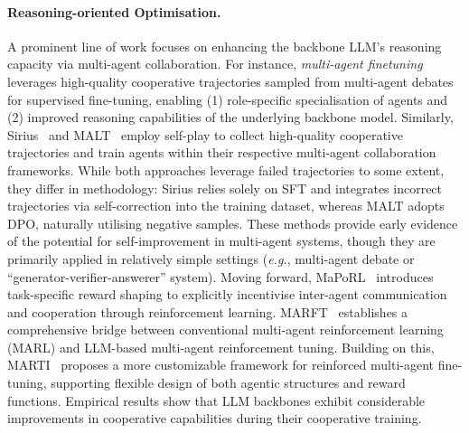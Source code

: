 \documentclass[]{selfevolagent}
\theoremstyle{plain}
\theoremstyle{definition}
\theoremstyle{remark}
\begin{document}
\paragraph{{Reasoning-oriented Optimisation.}} A prominent line of work focuses on enhancing the backbone LLM's reasoning capacity via multi-agent collaboration. For instance, \emph{multi-agent finetuning}~\citep{subramaniam2025multiagent-ft} leverages high-quality cooperative trajectories sampled from multi-agent debates for supervised fine-tuning, enabling (1) role-specific specialisation of agents and (2) improved reasoning capabilities of the underlying backbone model. Similarly, Sirius~\citep{zhao2025sirius} and MALT~\citep{motwani2024malt} employ self-play to collect high-quality cooperative trajectories and train agents within their respective multi-agent collaboration frameworks. While both approaches leverage failed trajectories to some extent, they differ in methodology: Sirius relies solely on SFT and integrates incorrect trajectories via self-correction into the training dataset, whereas MALT adopts DPO, naturally utilising negative samples. These methods provide early evidence of the potential for self-improvement in multi-agent systems, though they are primarily applied in relatively simple settings (\textit{e.g.}, multi-agent debate or “generator-verifier-answerer” system). Moving forward, MaPoRL~\citep{park2025maporl} introduces task-specific reward shaping to explicitly incentivise inter-agent communication and cooperation through reinforcement learning. MARFT~\citep{liao2025marft} establishes a comprehensive bridge between conventional multi-agent reinforcement learning (MARL) and LLM-based multi-agent reinforcement tuning. Building on this, MARTI~\citep{liao2025marft} proposes a more customizable framework for reinforced multi-agent fine-tuning, supporting flexible design of both agentic structures and reward functions. Empirical results show that LLM backbones exhibit considerable improvements in cooperative capabilities during their cooperative training.
\end{document}
